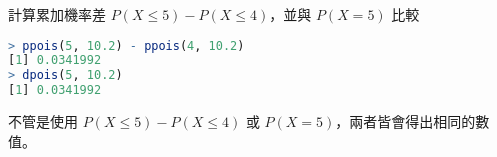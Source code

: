 計算累加機率差 $P(X \leq 5) - P(X \leq 4)$，並與 $P(X = 5)$ 比較

\begin{lstlisting}[language=R]
> ppois(5, 10.2) - ppois(4, 10.2)
[1] 0.0341992
> dpois(5, 10.2)
[1] 0.0341992
\end{lstlisting}
不管是使用 $P(X \leq 5) - P(X \leq 4)$ 或  $P(X = 5)$，兩者皆會得出相同的數值。
